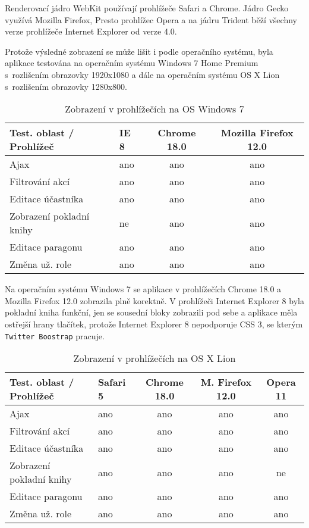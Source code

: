 \documentclass[thesis=B,czech]{FITthesis}[2012/04/27]
\begin{document}
Renderovací jádro WebKit používají prohlížeče Safari a Chrome. Jádro Gecko využívá Mozilla Firefox, Presto prohlížec Opera a na jádru Trident běží všechny verze prohlížeče Internet Explorer od verze 4.0.

Protože výsledné zobrazení se může lišit i podle operačního systému, byla aplikace testována na operačním systému Windows 7 Home Premium s~rozlišením obrazovky 1920x1080 a dále na operačním systému OS X Lion s~rozlišením obrazovky 1280x800. 

 \begin{table}[h]\centering
 	\caption{Zobrazení v prohlížečích na OS Windows 7}\label{tab:browsersWin}
 	\begin{tabular}{| l | l | c | c  | }\hline
 		Test. oblast / Prohlížeč	& IE 8		& Chrome 18.0		& Mozilla Firefox 12.0	\tabularnewline \hline
		Ajax 						& ano		& ano			& ano				\tabularnewline \hline
		Filtrování akcí				& ano		& ano			& ano				\tabularnewline \hline
		Editace účastníka 			& ano		& ano			& ano				\tabularnewline \hline
		Zobrazení pokladní knihy 	& ne			& ano			& ano				\tabularnewline \hline
		Editace paragonu 			& ano		& ano			& ano				\tabularnewline \hline
		Změna už. role 			& ano		& ano			& ano				\tabularnewline \hline
 	\end{tabular}
 \end{table}

Na operačním systému Windows 7 se aplikace v prohlížečích Chrome 18.0 a Mozilla Firefox 12.0 zobrazila plně korektně. V prohlížeči Internet Explorer 8 byla pokladní kniha funkční, jen se sousední bloky zobrazili pod sebe a aplikace měla ostřejší hrany tlačítek, protože Internet Explorer 8 nepodporuje CSS 3, se kterým \texttt{Twitter Boostrap} pracuje.

 \begin{table}[h]\centering
 	\caption{Zobrazení v prohlížečích na OS X Lion}\label{tab:browsersMac}
 	\begin{tabular}{| l | l | c | c | c  | }\hline
 		Test. oblast / Prohlížeč		& Safari 5		& Chrome 18.0		& M. Firefox 12.0	& Opera 11 	\tabularnewline \hline
		Ajax						& ano		& ano			& ano			& ano		\tabularnewline \hline
		Filtrování akcí				& ano		& ano			& ano			& ano 		\tabularnewline \hline
		Editace účastníka 			& ano		& ano			& ano			& ano		\tabularnewline \hline
		Zobrazení pokladní knihy 	& ano		& ano			& ano			& ne			\tabularnewline \hline
		Editace paragonu 			& ano		& ano			& ano			& ano		\tabularnewline \hline
		Změna už. role 			& ano		& ano			& ano		 	& ano		\tabularnewline \hline
 	\end{tabular}
 \end{table}
\end{document}
